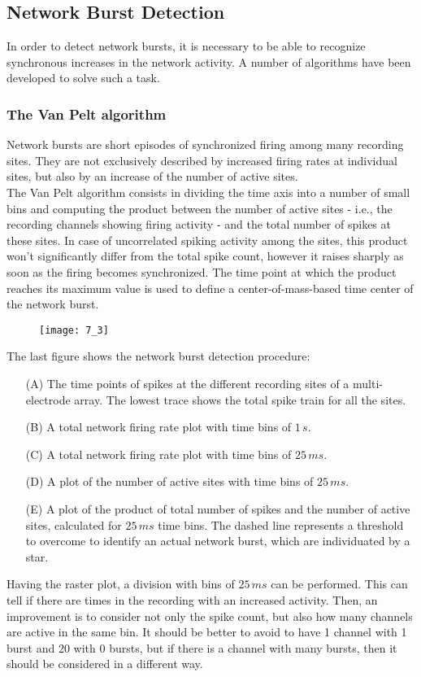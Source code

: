 \subsection{Network Burst Detection}
In order to detect network bursts, it is necessary to be able to recognize synchronous
increases in the network activity. A number of algorithms have been developed to
solve such a task.
\subsubsection{The Van Pelt algorithm}
Network bursts are short episodes of synchronized firing among many recording sites.
They are not exclusively described by increased firing rates at individual sites, but
also by an increase of the number of active sites.\\
The Van Pelt algorithm consists in dividing the time axis into a number of small bins
and computing the product between the number of active sites - i.e., the recording channels
showing firing activity - and the total number of spikes at these sites. In case of
uncorrelated spiking activity among the sites, this product won't significantly
differ from the total spike count, however it raises sharply as soon as the firing
becomes synchronized. The time point at which the product reaches its maximum value is
used to define a center-of-mass-based time center of the network burst.
\begin{figure}[H]
    \texttt{[image: 7\_3]}
    \centering
\end{figure}
\pagebreak
The last figure shows the network burst detection procedure:
\begin{itemize}
    \item[(A)] The time points of spikes at the different recording sites of
        a multi-electrode array. The lowest trace shows the total spike train for all
        the sites.
    \item[(B)] A total network firing rate plot with time bins of \(1\,s\).
    \item[(C)] A total network firing rate plot with time bins of \(25\,ms\).
    \item[(D)] A plot of the number of active sites with time bins
        of \(25\,ms\).
    \item[(E)] A plot of the product of total number of spikes and the
        number of active sites, calculated for \(25\,ms\) time bins. The dashed line
        represents a threshold to overcome to identify an actual network burst, which
        are individuated by a star.
\end{itemize}
Having the raster plot, a division with bins of \(25\,ms\) can be performed. This can
tell if there are times in the recording with an increased activity. Then, an
improvement is to consider not only the spike count, but also how many channels are
active in the same bin. It should be better to avoid to have 1 channel with 1 burst
and 20 with 0 bursts, but if there is a channel with many bursts, then it should be
considered in a different way.
